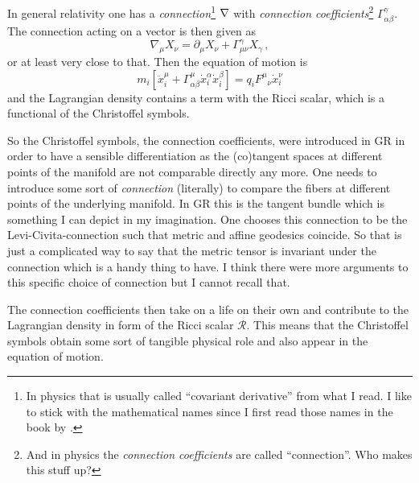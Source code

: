 \documentclass[11pt, english, fleqn, DIV=15, headinclude]{scrartcl}
\begin{document}
\begin{multicols}{2}
    In general relativity one has a \emph{connection}\footnote{%
        In physics that is usually called \enquote{covariant derivative} from
        what I read. I like to stick with the mathematical names since I first
        read those names in the book by \textcite{penrose-road_to_reality}.
    } $\vnabla$ with \emph{connection coefficients}\footnote{%
        And in physics the \emph{connection coefficients} are called
        \enquote{connection}. Who makes this stuff up?
    } $\Gamma^\gamma_{\alpha\beta}$. The connection acting on a vector is then
    given as
    \[
        \nabla_\mu X_\nu
        = \partial_\mu X_\nu + \Gamma^\gamma_{\mu\nu} X_\gamma \,,
    \]
    or at least very close to that.
    Then the equation of motion is
    \[
        m_i \left[ \ddot x^\mu_i + \Gamma_{\alpha\beta}^\mu \dot x_i^\alpha
        \dot x_i^\beta \right] = q_i F^\mu{}_\nu \dot x_i^\nu
    \]
    and the Lagrangian density contains a term with the Ricci scalar, which is a
    functional of the Christoffel symbols.

    So the Christoffel symbols, the connection coefficients, were introduced in
    GR in order to have a sensible differentiation as the (co)tangent spaces at
    different points of the manifold are not comparable directly any more. One
    needs to introduce some sort of \emph{connection} (literally) to compare
    the fibers at different points of the underlying manifold. In GR this is
    the tangent bundle which is something I can depict in my imagination. One
    chooses this connection to be the Levi-Civita-connection such that metric
    and affine geodesics coincide. So that is just a complicated way to say
    that the metric tensor is invariant under the connection which is a handy
    thing to have. I think there were more arguments to this specific choice of
    connection but I cannot recall that.

    The connection coefficients then take on a life on their own and contribute
    to the Lagrangian density in form of the Ricci scalar $\mathcal R$. This
    means that the Christoffel symbols obtain some sort of tangible physical
    role and also appear in the equation of motion.


\end{multicols}
\end{document}
